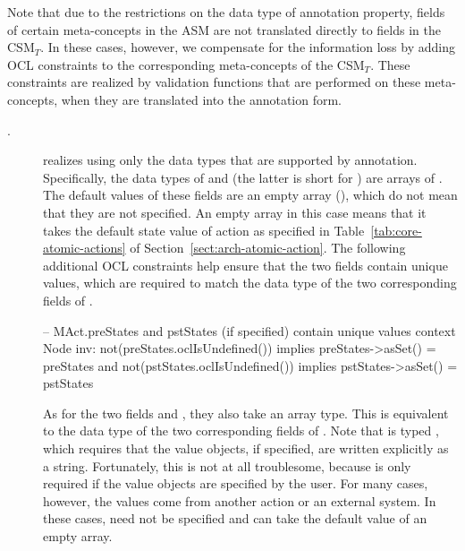 Note that due to the restrictions on the data type of annotation property, fields of certain meta-concepts in the ASM are not translated directly to fields in the CSM$_T$. In these cases, however, we compensate for the information loss by adding OCL constraints to the corresponding meta-concepts of the CSM$_T$. These constraints are realized by validation functions that are performed on these meta-concepts, when they are translated into the annotation form.
%
\begin{description}
\item[.]  realizes  using only the data types that are supported by annotation. Specifically, the data types of  and  (the latter is short for ) are arrays of . The default values of these fields are an empty array (\code{[]}), which do not mean that they are not specified. An empty array in this case means that it takes the default state value of action as specified in Table~\ref{tab:core-atomic-actions} of Section~\ref{sect:arch-atomic-action}.
The following additional OCL constraints help ensure that the two fields contain unique values, which are required to match the  data type of the two corresponding fields of .
\begin{lstrule}
-- MAct.preStates and pstStates (if specified) contain unique values
context Node inv:
  not(preStates.oclIsUndefined()) implies preStates->asSet() = preStates and 
  not(pstStates.oclIsUndefined()) implies pstStates->asSet() = pstStates
\end{lstrule}

As for the two fields  and , they also take an array type. This is equivalent to the  data type of the two corresponding fields of . Note that  is typed , which requires that the value objects, if specified, are written explicitly as a string. Fortunately, this is not at all troublesome, because  is only required if the value objects are specified by the user. For many cases, however, the values come from another action or an external system. In these cases,  need not be specified and can take the default value of an empty array.


\end{description}
